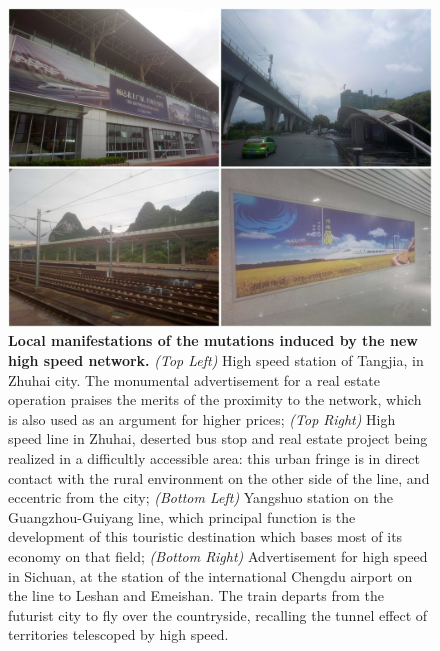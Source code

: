 \begin{figure}
	\includegraphics[width=\linewidth]{figures/1-3-1-fig-qualitative-hsr}
	\caption{\textbf{Local manifestations of the mutations induced by the new high speed network.} \textit{(Top Left)} High speed station of Tangjia, in Zhuhai city. The monumental advertisement for a real estate operation praises the merits of the proximity to the network, which is also used as an argument for higher prices; \textit{(Top Right)} High speed line in Zhuhai, deserted bus stop and real estate project being realized in a difficultly accessible area: this urban fringe is in direct contact with the rural environment on the other side of the line, and eccentric from the city; \textit{(Bottom Left)} Yangshuo station on the Guangzhou-Guiyang line, which principal function is the development of this touristic destination which bases most of its economy on that field; \textit{(Bottom Right)} Advertisement for high speed in Sichuan, at the station of the international Chengdu airport on the line to Leshan and Emeishan. The train departs from the futurist city to fly over the countryside, recalling the tunnel effect of territories telescoped by high speed.\label{fig:qualitative:hsr}}
\end{figure}


